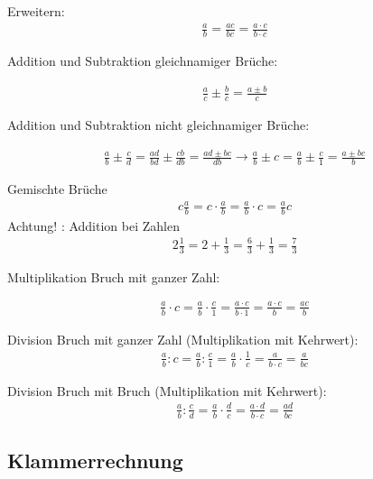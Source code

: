 \documentclass[12pt,a4paper,fleqn,twoside,pdf,final]{article}
\begin{document}
Erweitern:
\begin{align*}
\frac{a}{b} =  \frac{ac}{bc} =   \frac{a \cdot c}{b \cdot c} 
\end{align*}

Addition und Subtraktion gleichnamiger Brüche:

\begin{align*}
  \frac{a}{c} \pm \frac{b}{c} =  \frac{a \pm b}{c} 
\end{align*}

Addition und Subtraktion nicht gleichnamiger Brüche:

\begin{align*}
\frac{a}{b} \pm \frac{c}{d} = \frac{ad}{bd} \pm \frac{cb}{db} = \frac{ad \pm bc}{db} \longrightarrow \frac{a}{b} \pm c = \frac{a}{b} \pm \frac{c}{1} = \frac{a \pm bc}{b} 
\end{align*}

Gemischte Brüche
\begin{align*}
  c\frac{a}{b} = c \cdot \frac{a}{b}= \frac{a}{b} \cdot c= \frac{a}{b}c
\end{align*}
Achtung! : Addition bei Zahlen
\begin{align*}
2\frac{1}{3} = 2+\frac{1}{3} =  \frac{6}{3} + \frac{1}{3} = \frac{7}{3} 
\end{align*}


Multiplikation Bruch mit ganzer Zahl:

\begin{align*}
\frac{a}{b} \cdot c = \frac{a}{b}  \cdot \frac{c}{1}  = \frac{a \cdot c}{b \cdot 1} = \frac{a \cdot c}{b}  = \frac{a c}{b} 
\end{align*}

Division Bruch mit ganzer Zahl (Multiplikation mit Kehrwert):
\begin{align*}
\frac{a}{b} : c = \frac{a}{b} : \frac{c}{1} =  \frac{a}{b} \cdot \frac{1}{c} = \frac{a}{b \cdot c}  = \frac{a}{b c} 
\end{align*}

Division Bruch mit Bruch (Multiplikation mit Kehrwert):
\begin{align*}
\frac{a}{b} : \frac{c}{d} = \frac{a}{b}  \cdot \frac{d}{c} = \frac{a \cdot d }{b \cdot c} = \frac{a d }{b c} 
\end{align*}




\pagebreak
\subsection{Klammerrechnung}
\end{document}
